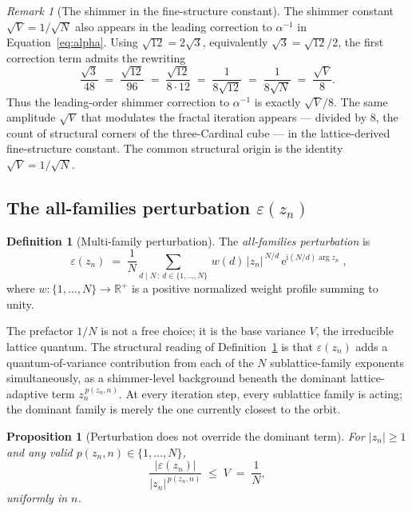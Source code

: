 \documentclass[11pt,a4paper]{article}
\newtheorem{proposition}[theorem]{Proposition}
\theoremstyle{definition}
\newtheorem{definition}[theorem]{Definition}
\theoremstyle{remark}
\newtheorem{remark}[theorem]{Remark}
\newcommand{\R}{\mathbb{R}}
\begin{document}
\begin{remark}[The shimmer in the fine-structure constant]
The shimmer constant $\sqrt{V}=1/\sqrt{N}$ also appears in the leading correction to $\alpha^{-1}$ in Equation~\eqref{eq:alpha}. Using $\sqrt{12}=2\sqrt{3}$, equivalently $\sqrt{3}=\sqrt{12}/2$, the first correction term admits the rewriting
\[
\frac{\sqrt{3}}{48} \;=\; \frac{\sqrt{12}}{96} \;=\; \frac{\sqrt{12}}{8\cdot 12} \;=\; \frac{1}{8\sqrt{12}} \;=\; \frac{1}{8\sqrt{N}} \;=\; \frac{\sqrt{V}}{8}.
\]
Thus the leading-order shimmer correction to $\alpha^{-1}$ is exactly $\sqrt{V}/8$. The same amplitude $\sqrt{V}$ that modulates the fractal iteration appears --- divided by $8$, the count of structural corners of the three-Cardinal cube --- in the lattice-derived fine-structure constant. The common structural origin is the identity $\sqrt{V}=1/\sqrt{N}$.
\end{remark}

\subsection{The all-families perturbation $\varepsilon(z_{n})$}\label{subsec:dI-perturb}

\begin{definition}[Multi-family perturbation]\label{def:dI-eps}
The \emph{all-families perturbation} is
\[
\boxed{\;\varepsilon(z_{n}) \;=\; \frac{1}{N}\sum_{d\mid N\,:\,d\in\{1,\ldots,N\}}\, w(d)\,|z_{n}|^{\,N/d}\,\mathrm{e}^{\mathrm{i}(N/d)\arg z_{n}}\;,}
\]
where $w:\{1,\ldots,N\}\to\R^{+}$ is a positive normalized weight profile summing to unity.
\end{definition}

The prefactor $1/N$ is not a free choice; it is the base variance $V$, the irreducible lattice quantum. The structural reading of Definition~\ref{def:dI-eps} is that $\varepsilon(z_{n})$ adds a quantum-of-variance contribution from each of the $N$ sublattice-family exponents simultaneously, as a shimmer-level background beneath the dominant lattice-adaptive term $z_{n}^{\,p(z_{n},n)}$. At every iteration step, every sublattice family is acting; the dominant family is merely the one currently closest to the orbit.

\begin{proposition}[Perturbation does not override the dominant term]
For $|z_{n}|\geq 1$ and any valid $p(z_{n},n)\in\{1,\ldots,N\}$,
\[
\frac{|\varepsilon(z_{n})|}{|z_{n}|^{\,p(z_{n},n)}} \;\leq\; V \;=\; \frac{1}{N},
\]
uniformly in $n$.
\end{proposition}
\end{document}
